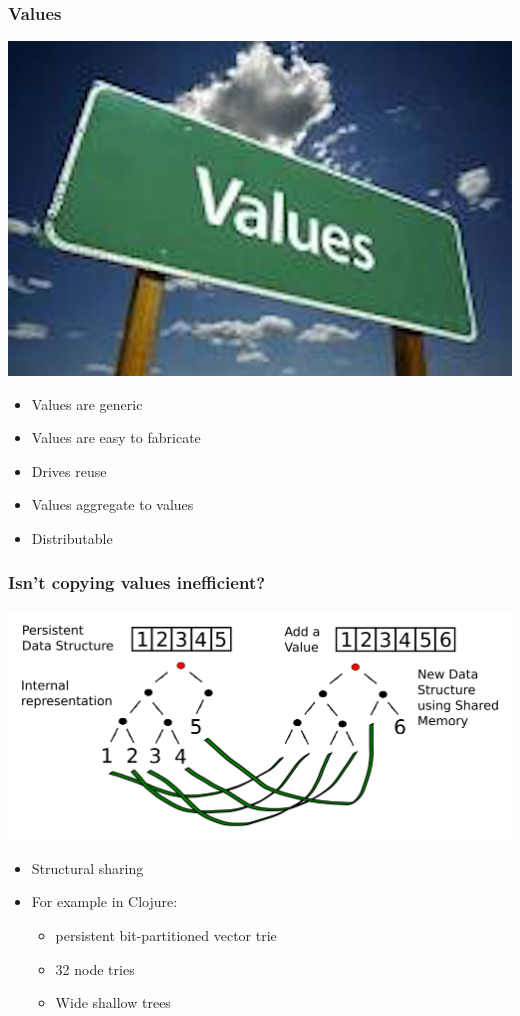 \documentclass[11pt]{article}
\begin{document}
\subsubsection*{Values}
\label{sec:orgheadline17}

\includegraphics[width=.9\linewidth]{./values.jpeg}
\begin{itemize}
\item Values are generic
\item Values are easy to fabricate
\item Drives reuse
\item Values aggregate to values
\item Distributable
\end{itemize}

\subsubsection*{Isn't copying values inefficient?}
\label{sec:orgheadline18}

\includegraphics[width=.9\linewidth]{./clojure-persistent-data-structures-sharing.png}

\begin{itemize}
\item Structural sharing
\item For example in Clojure:
\begin{itemize}
\item persistent bit-partitioned vector trie
\item 32 node tries
\item Wide shallow trees
\end{itemize}
\end{itemize}
\end{document}

